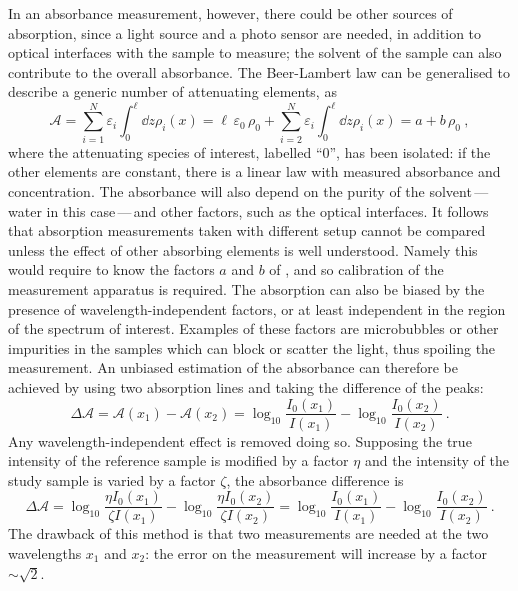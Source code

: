 In an absorbance measurement, however, there could be other sources of absorption, %
since a light source and a photo sensor are needed, in addition to optical interfaces with the %
sample to measure; the solvent of the sample can also contribute to the overall absorbance.
The Beer-Lambert law can be generalised to describe a generic number of attenuating elements, %
as 
\begin{equation}
	\label{eq:linear_bl}
	\mathcal{A} = \sum_{i = 1}^N \varepsilon_i \int_0^\ell \dd{z} \rho_i (x) = %
	\ell\,\varepsilon_0\,\rho_0 +  \sum_{i = 2}^N \varepsilon_i \int_0^\ell \dd{z} \rho_i (x) = a + b \, \rho_0\ ,
\end{equation}
where the attenuating species of interest, labelled ``0'', has been isolated: %
if the other elements are constant, there is a linear law with measured absorbance and concentration.
The absorbance will also depend on the purity of the solvent\,---\,water in this case\,---\,and other factors, %
such as the optical interfaces.
It follows that absorption measurements taken with different setup cannot be compared unless the %
effect of other absorbing elements is well understood.
Namely this would require to know the factors $a$ and $b$ of , %
and so calibration of the measurement apparatus is required.
The absorption can also be biased by the presence of wavelength-independent factors, %
or at least independent in the region of the spectrum of interest.
Examples of these factors are microbubbles or other impurities in the samples which %
can block or scatter the light, thus spoiling the measurement.
An unbiased estimation of the absorbance can therefore be achieved by using two absorption lines %
and taking the difference of the peaks: %
\begin{equation}
	\Delta \mathcal{A} = \mathcal{A}(x_1) - \mathcal{A}(x_2) = %
	\log_{10} \frac{I_0 (x_1)}{I(x_1)} - \log_{10} \frac{I_0 (x_2)}{I(x_2)}\ .
\end{equation}
Any wavelength-independent effect is removed doing so.
Supposing the true intensity of the reference sample is modified by a factor $\eta$ %
and the intensity of the study sample is varied by a factor $\zeta$, the absorbance difference is
\begin{equation}
	\Delta \mathcal{A} = %
	\log_{10} \frac{\eta I_0 (x_1)}{\zeta I(x_1)} - \log_{10} \frac{\eta I_0 (x_2)}{\zeta I(x_2)} = %
	\log_{10} \frac{I_0 (x_1)}{I(x_1)} - \log_{10} \frac{I_0 (x_2)}{I(x_2)}\ .
\end{equation}
The drawback of this method is that two measurements are needed at the two wavelengths $x_1$ and $x_2$: 
the error on the measurement will increase by a factor~$\sim\sqrt{2}$.



